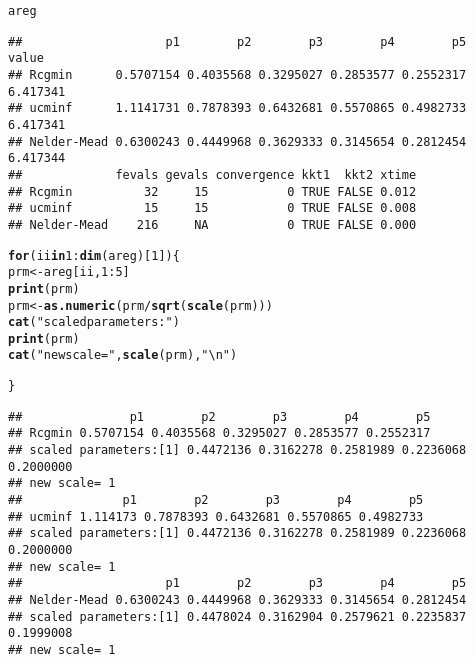 \documentclass[11pt]{article}\usepackage[]{graphicx}\usepackage[]{color}
\makeatletter
\newcommand{\hlnum}[1]{\textcolor[rgb]{0.686,0.059,0.569}{#1}}%
\newcommand{\hlstr}[1]{\textcolor[rgb]{0.192,0.494,0.8}{#1}}%
\newcommand{\hlopt}[1]{\textcolor[rgb]{0,0,0}{#1}}%
\newcommand{\hlstd}[1]{\textcolor[rgb]{0.345,0.345,0.345}{#1}}%
\newcommand{\hlkwa}[1]{\textcolor[rgb]{0.161,0.373,0.58}{\textbf{#1}}}%
\newcommand{\hlkwb}[1]{\textcolor[rgb]{0.69,0.353,0.396}{#1}}%
\newcommand{\hlkwd}[1]{\textcolor[rgb]{0.737,0.353,0.396}{\textbf{#1}}}%
\newenvironment{kframe}{%
 \def\at@end@of@kframe{}%
 \ifinner\ifhmode%
  \def\at@end@of@kframe{\end{minipage}}%
  \begin{minipage}{\columnwidth}%
 \fi\fi%
 \def\FrameCommand##1{\hskip\@totalleftmargin \hskip-\fboxsep
 \colorbox{shadecolor}{##1}\hskip-\fboxsep
     \hskip-\linewidth \hskip-\@totalleftmargin \hskip\columnwidth}%
 \MakeFramed {\advance\hsize-\width
   \@totalleftmargin\z@ \linewidth\hsize
   \@setminipage}}%
 {\par\unskip\endMakeFramed%
 \at@end@of@kframe}
\newenvironment{knitrout}{}{} %
\makeatother
\begin{document}
\begin{knitrout}
\begin{kframe}
{\ttfamily\noindent\color{warningcolor}{\#\# Warning in log(x/sc): NaNs produced}}

{\ttfamily\noindent\color{warningcolor}{\#\# Warning in Rcgminu(par = spar, fn = efn, gr = egr, control = mcontrol, ...): Rcgmin - undefined function}}

{\ttfamily\noindent\color{warningcolor}{\#\# Warning in log(x/sc): NaNs produced}}

{\ttfamily\noindent\color{warningcolor}{\#\# Warning in Rcgminu(par = spar, fn = efn, gr = egr, control = mcontrol, ...): Rcgmin - undefined function}}\begin{alltt}
\hlstd{areg}
\end{alltt}
\begin{verbatim}
##                    p1        p2        p3        p4        p5    value
## Rcgmin      0.5707154 0.4035568 0.3295027 0.2853577 0.2552317 6.417341
## ucminf      1.1141731 0.7878393 0.6432681 0.5570865 0.4982733 6.417341
## Nelder-Mead 0.6300243 0.4449968 0.3629333 0.3145654 0.2812454 6.417344
##             fevals gevals convergence kkt1  kkt2 xtime
## Rcgmin          32     15           0 TRUE FALSE 0.012
## ucminf          15     15           0 TRUE FALSE 0.008
## Nelder-Mead    216     NA           0 TRUE FALSE 0.000
\end{verbatim}
\begin{alltt}
\hlkwa{for} \hlstd{(ii} \hlkwa{in} \hlnum{1}\hlopt{:}\hlkwd{dim}\hlstd{(areg)[}\hlnum{1}\hlstd{])\{}
    \hlstd{prm} \hlkwb{<-} \hlstd{areg[ii,}\hlnum{1}\hlopt{:}\hlnum{5}\hlstd{]}
    \hlkwd{print}\hlstd{(prm)}
    \hlstd{prm}\hlkwb{<-}\hlkwd{as.numeric}\hlstd{(prm}\hlopt{/}\hlkwd{sqrt}\hlstd{(}\hlkwd{scale}\hlstd{(prm)))}
    \hlkwd{cat}\hlstd{(}\hlstr{"scaled parameters:"}\hlstd{)}
    \hlkwd{print}\hlstd{(prm)}
    \hlkwd{cat}\hlstd{(}\hlstr{"new scale="}\hlstd{,} \hlkwd{scale}\hlstd{(prm),}\hlstr{"\textbackslash{}n"}\hlstd{)}

\hlstd{\}}
\end{alltt}
\begin{verbatim}
##               p1        p2        p3        p4        p5
## Rcgmin 0.5707154 0.4035568 0.3295027 0.2853577 0.2552317
## scaled parameters:[1] 0.4472136 0.3162278 0.2581989 0.2236068 0.2000000
## new scale= 1 
##              p1        p2        p3        p4        p5
## ucminf 1.114173 0.7878393 0.6432681 0.5570865 0.4982733
## scaled parameters:[1] 0.4472136 0.3162278 0.2581989 0.2236068 0.2000000
## new scale= 1 
##                    p1        p2        p3        p4        p5
## Nelder-Mead 0.6300243 0.4449968 0.3629333 0.3145654 0.2812454
## scaled parameters:[1] 0.4478024 0.3162904 0.2579621 0.2235837 0.1999008
## new scale= 1
\end{verbatim}
\end{kframe}
\end{knitrout}
\end{document}
